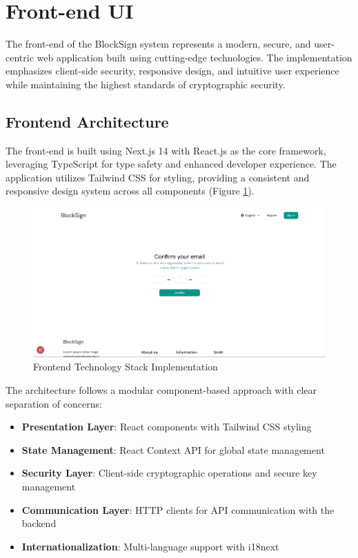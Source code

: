 \section{Front-end UI}
The front-end of the BlockSign system represents a modern, secure, and user-centric web application built using cutting-edge technologies. The implementation emphasizes client-side security, responsive design, and intuitive user experience while maintaining the highest standards of cryptographic security.

\subsection{Frontend Architecture}
The front-end is built using Next.js 14 with React.js as the core framework, leveraging TypeScript for type safety and enhanced developer experience. The application utilizes Tailwind CSS for styling, providing a consistent and responsive design system across all components (Figure \ref{frontend-stack}).

\begin{figure}[H]
    \centering
    \includegraphics[width=18cm]{"images/siteUI/code.png"}
    \caption{Frontend Technology Stack Implementation}
    \label{frontend-stack}
\end{figure}

The architecture follows a modular component-based approach with clear separation of concerns:

\begin{itemize}
    \item \textbf{Presentation Layer}: React components with Tailwind CSS styling
    \item \textbf{State Management}: React Context API for global state management
    \item \textbf{Security Layer}: Client-side cryptographic operations and secure key management
    \item \textbf{Communication Layer}: HTTP clients for API communication with the backend
    \item \textbf{Internationalization}: Multi-language support with i18next
\end{itemize}

